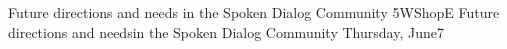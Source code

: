 \begin{wsschedule}
{Future directions and needs in the Spoken Dialog Community}
{5}{WShopE}
{Future directions and needs\linebreak in the Spoken Dialog Community}
{Thursday, June7}{\WShopLocE}

\end{wsschedule}
